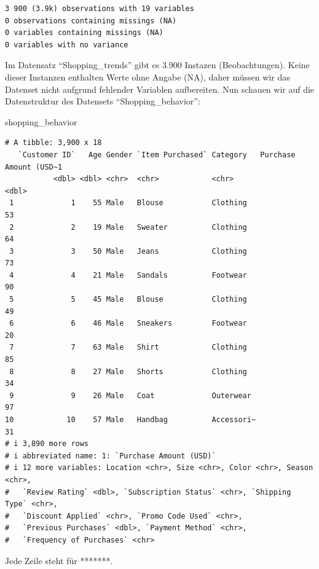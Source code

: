 \documentclass[
  letterpaper,
  DIV=11]{scrartcl}
\newenvironment{Shaded}{\begin{snugshade}}{\end{snugshade}}
\newcommand{\NormalTok}[1]{\textcolor[rgb]{0.00,0.23,0.31}{#1}}
\begin{document}
\begin{verbatim}
3 900 (3.9k) observations with 19 variables
0 observations containing missings (NA)
0 variables containing missings (NA)
0 variables with no variance
\end{verbatim}

Im Datensatz ``Shopping\_trends'' gibt es 3.900 Instazen
(Beobachtungen). Keine dieser Instanzen enthalten Werte ohne Angabe
(NA), daher müssen wir das Datenset nicht aufgrund fehlender Variablen
aufbereiten. Nun schauen wir auf die Datenstruktur des Datensets
``Shopping\_behavior'':

\begin{Shaded}
\begin{Highlighting}[]
\NormalTok{shopping\_behavior}
\end{Highlighting}
\end{Shaded}

\begin{verbatim}
# A tibble: 3,900 x 18
   `Customer ID`   Age Gender `Item Purchased` Category   Purchase Amount (USD~1
           <dbl> <dbl> <chr>  <chr>            <chr>                       <dbl>
 1             1    55 Male   Blouse           Clothing                       53
 2             2    19 Male   Sweater          Clothing                       64
 3             3    50 Male   Jeans            Clothing                       73
 4             4    21 Male   Sandals          Footwear                       90
 5             5    45 Male   Blouse           Clothing                       49
 6             6    46 Male   Sneakers         Footwear                       20
 7             7    63 Male   Shirt            Clothing                       85
 8             8    27 Male   Shorts           Clothing                       34
 9             9    26 Male   Coat             Outerwear                      97
10            10    57 Male   Handbag          Accessori~                     31
# i 3,890 more rows
# i abbreviated name: 1: `Purchase Amount (USD)`
# i 12 more variables: Location <chr>, Size <chr>, Color <chr>, Season <chr>,
#   `Review Rating` <dbl>, `Subscription Status` <chr>, `Shipping Type` <chr>,
#   `Discount Applied` <chr>, `Promo Code Used` <chr>,
#   `Previous Purchases` <dbl>, `Payment Method` <chr>,
#   `Frequency of Purchases` <chr>
\end{verbatim}

Jede Zeile steht für *******.
\end{document}
